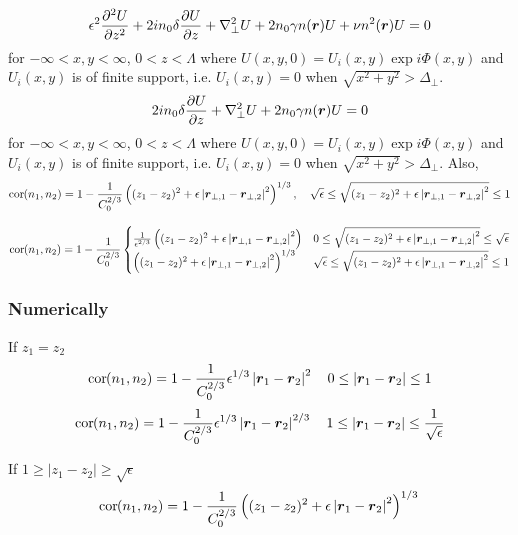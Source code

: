\begin{equation}
 \epsilon^2 \frac{\partial^2 U}{\partial z^2} + 2i n_0 \delta \frac{\partial U}{\partial z}   + \nabla_{\perp}^2 U 
   +  2n_0  \gamma n(\mbox{\boldmath{$r$}}) U + \nu n^2(\mbox{\boldmath{$r$}}) U = 0 
\end{equation}
for $-\infty < x,y < \infty$, $0 < z < \Lambda$ where $U(x,y,0) = U_{i}(x,y)\exp{i \Phi(x,y)}$
and $U_{i}(x,y)$ is of finite support, i.e. $U_{i}(x,y) = 0$ when $\sqrt{x^2 + y^2} > \Delta_{\perp}$.
\begin{equation}
  2i n_0 \delta \frac{\partial U}{\partial z}  + \nabla_{\perp}^2 U + 2 n_0 \gamma n(\mbox{\boldmath{$r$}}) U = 0 
\end{equation}
for $-\infty < x,y < \infty$, $0 < z < \Lambda$ where $U(x,y,0) = U_{i}(x,y)\exp{i \Phi(x,y)}$
and $U_{i}(x,y)$ is of finite support, i.e. $U_{i}(x,y) = 0$ when $\sqrt{x^2 + y^2} > \Delta_{\perp}$.
Also, 
\begin{equation}
\begin{split}
  \cor{n_1,n_2} = 1 - \frac{1}{C_0^{2/3}} \left( (z_{1} - z_{2})^{2} 
  + \epsilon \left|\vect{r}_{\perp,1}-\vect{r}_{\perp,2}\right|^{2}\right)^{1/3}, 
  \quad  \sqrt{\epsilon} \leq \sqrt{(z_{1} - z_{2})^{2} + \epsilon \left|\vect{r}_{\perp,1}-\vect{r}_{\perp,2}\right|^{2}}  \leq  1
\end{split}
\end{equation}

\begin{equation}
  \cor{n_1,n_2} = 1 - 
    \frac{1}{C_0^{2/3}}  \begin{cases}
        \frac{1}{\epsilon^{2/3}} \left( (z_{1} - z_{2})^{2} 
  + \epsilon \left|\vect{r}_{\perp,1}-\vect{r}_{\perp,2}\right|^{2}\right) & 0 \leq \sqrt{(z_{1} - z_{2})^{2} + \epsilon \left|\vect{r}_{\perp,1}-\vect{r}_{\perp,2}\right|^{2}}  \leq  \sqrt{\epsilon} \\
        \left( (z_{1} - z_{2})^{2} 
  + \epsilon \left|\vect{r}_{\perp,1}-\vect{r}_{\perp,2}\right|^{2}\right)^{1/3} &  \sqrt{\epsilon} \leq \sqrt{(z_{1} - z_{2})^{2} + \epsilon \left|\vect{r}_{\perp,1}-\vect{r}_{\perp,2}\right|^{2}}  \leq  1  \\
   \end{cases}
\end{equation}



\subsubsection{Numerically}
If $z_{1} = z_{2}$
\begin{equation}
  \cor{n_1,n_2} = 1 - \frac{1}{C_0^{2/3}} \epsilon^{1/3} \left|\vect{r}_{1}-\vect{r}_{2}\right|^{2} \quad 0 \leq \left|\vect{r}_{1}-\vect{r}_{2}\right| \leq 1  
\end{equation}
\begin{equation}
  \cor{n_1,n_2} = 1 - \frac{1}{C_0^{2/3}} \epsilon^{1/3} \left|\vect{r}_{1}-\vect{r}_{2}\right|^{2/3} \quad 1 \leq \left|\vect{r}_{1}-\vect{r}_{2}\right| \leq \frac{1}{\sqrt{\epsilon}}  
\end{equation}

If $1 \geq |z_{1} - z_{2}| \geq \sqrt{\epsilon}$
\begin{equation}
    \cor{n_1,n_2} = 1 - \frac{1}{C_0^{2/3}} \left( (z_{1} - z_{2})^{2}  + \epsilon \left|\vect{r}_{1}-\vect{r}_{2}\right|^{2}\right)^{1/3} \\  
\end{equation}

